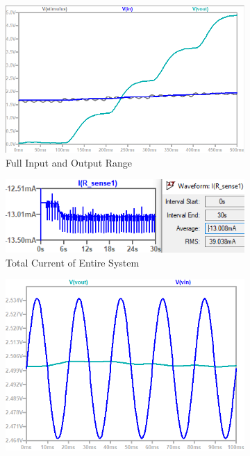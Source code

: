 \begin{figure}[h]
 \footnotesize
 \centering
    \begin{subfigure}[]{0.45\textwidth}
              \centering
  		\includegraphics[width=1\linewidth]{./Figures/vout}
		    \caption{Full Input and Output Range} \label{subfig:vout}
     \end{subfigure}
     \begin{subfigure}[]{0.45\textwidth}
             \centering
  		\includegraphics[width=1.0\linewidth]{./Figures/current}
		   \caption{Total Current of Entire System} \label{subfig:current}
     \end{subfigure}
    \begin{subfigure}[]{0.45\textwidth}
              \centering
  		\includegraphics[width=1\linewidth]{./Figures/noise}

\end{subfigure}
\end{figure}
